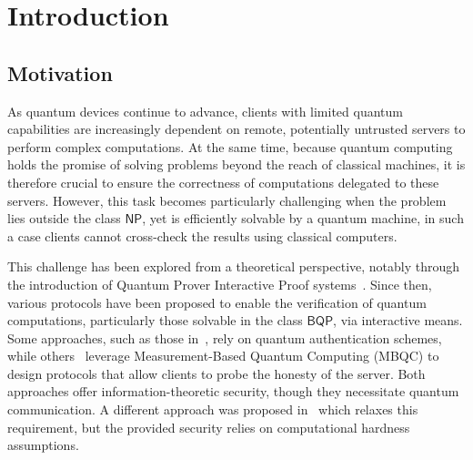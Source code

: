\section{Introduction}
\subsection{Motivation}

As quantum devices continue to advance, clients with limited quantum capabilities are increasingly dependent on remote, potentially untrusted servers to perform complex computations. At the same time, because quantum computing holds the promise of solving problems beyond the reach of classical machines, it is therefore crucial to ensure the correctness of computations delegated to these servers. However, this task becomes particularly challenging when the problem lies outside the class $\mathsf{NP}$, yet is efficiently solvable by a quantum machine, in such a case clients cannot cross-check the results using classical computers.

This challenge has been explored from a theoretical perspective, notably through the introduction of Quantum Prover Interactive Proof systems~\cite{ABE10interactive, ABEM17interactive}. Since then, various protocols have been proposed to enable the verification of quantum computations, particularly those solvable in the class $\mathsf{BQP}$, via interactive means. Some approaches, such as those in~\cite{ABE10interactive, ABEM17interactive}, rely on quantum authentication schemes, while others~\cite{FK17unconditionally} leverage Measurement-Based Quantum Computing (MBQC) to design protocols that allow clients to probe the honesty of the server. Both approaches offer information-theoretic security, though they necessitate quantum communication. A different approach was proposed in~\cite{M18classical} which relaxes this requirement, but the provided security relies on computational hardness assumptions.

